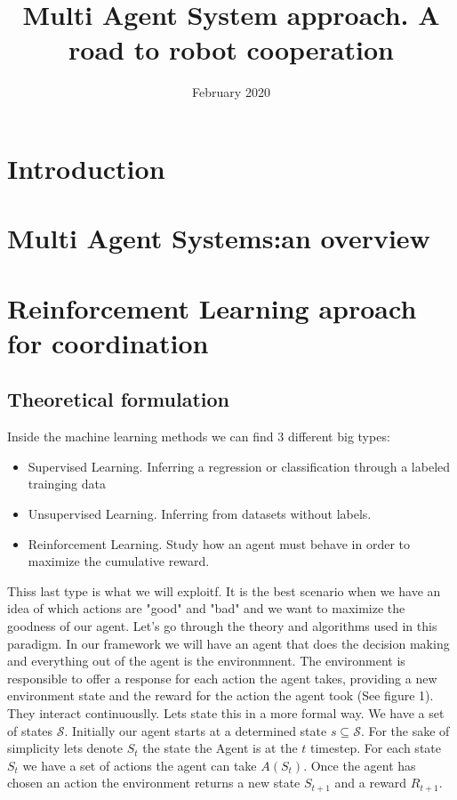 \documentclass{article}
\title{Multi Agent System approach. A road to robot cooperation}
\author{}
\date{February 2020}
\begin{document}
\maketitle

\section{Introduction}
\section{Multi Agent Systems:an overview}
\section{Reinforcement Learning aproach for 
coordination}
\subsection{Theoretical formulation}
Inside the machine learning methods we can find 3 different big types:
\begin{itemize}
\item Supervised Learning. Inferring a regression or classification through a labeled trainging data
\item Unsupervised Learning. Inferring from datasets without labels.
\item Reinforcement Learning. Study how an agent must behave in order to maximize the cumulative reward. 
\end{itemize}  
Thiss last type is what we will exploitf. It is the best scenario when we have an idea of which actions are "good" and "bad" and we want to maximize the goodness of our agent. Let's go through the theory and algorithms used in this paradigm.
\newline
In our framework we will have an agent that does the decision making and everything out of the agent is the environmnent. The environment is responsible to offer a response for each action the agent takes, providing a new environment state and the reward for the action the agent took (See figure 1). They interact continuouslly.
\newline
Lets state this in a more formal way.
We have a set of states $\mathcal{S}$. Initially our agent starts at a determined state $ s \subseteq \mathcal{S}$. For the sake of simplicity lets denote $S_{t}$ the state the Agent is at the $t$ timestep. For each state $S_{t}$ we have a set of actions the agent can take $A(S_{t})$. Once the agent has chosen an action the environment returns a new state $S_{t+1}$ and a reward $R_{t+1}$. \newline
\end{document}
